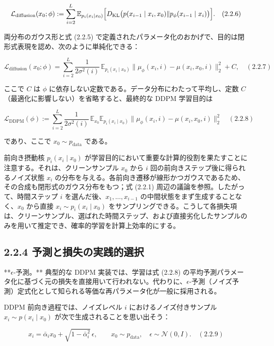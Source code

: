 \[
\mathcal{L}_{\mathrm{diffusion}}(x_0;\phi) := \sum_{i=2}^{L}\mathbb{E}_{p_i(x_i\mid x_0)}\Bigl[D_{\mathrm{KL}}\bigl(p(x_{i-1}\mid x_i,x_0)\Vert p_\phi(x_{i-1}\mid x_i)\bigr)\Bigr]. \quad (2.2.6)
\]


両分布のガウス形と式 (2.2.5) で定義されたパラメータ化のおかげで、目的は閉形式表現を認め、次のように単純化できる：

\[
\mathcal{L}_{\mathrm{diffusion}}(x_0;\phi) = \sum_{i=2}^{L}\frac{1}{2\sigma^2(i)}\,\mathbb{E}_{p_i(x_i\mid x_0)}\bigl\|\mu_\phi(x_i,i)-\mu(x_i,x_0,i)\bigr\|_2^2 + C, \quad (2.2.7)
\]


ここで $C$ は $\phi$ に依存しない定数である。データ分布にわたって平均し、定数 $C$（最適化に影響しない）を省略すると、最終的な DDPM 学習目的は

\[
\mathcal{L}_{\mathrm{DDPM}}(\phi) := \sum_{i=2}^{L}\frac{1}{2\sigma^2(i)}\,\mathbb{E}_{x_0}\mathbb{E}_{p_i(x_i\mid x_0)}\bigl\|\mu_\phi(x_i,i)-\mu(x_i,x_0,i)\bigr\|_2^2 \quad (2.2.8)
\]


であり、ここで $x_0\sim p_{\mathrm{data}}$ である。

前向き摂動核 $p_i(x_i\mid x_0)$ が学習目的において重要な計算的役割を果たすことに注意する。それは、クリーンサンプル $x_0$ から $i$ 回の前向きステップ後に得られるノイズ状態 $x_i$ の分布を与える。各前向き遷移が線形かつガウスであるため、その合成も閉形式のガウス分布をもつ；式 (2.2.1) 周辺の議論を参照。したがって、時間ステップ $i$ を選んだ後、$x_1,\ldots,x_{i-1}$ の中間状態をまず生成することなく、$x_0$ から直接 $x_i\sim p_i(x_i\mid x_0)$ をサンプリングできる。こうして各損失項は、クリーンサンプル、選ばれた時間ステップ、および直接劣化したサンプルのみを用いて推定でき、確率的学習を計算上効率的にする。

\subsection*{2.2.4 予測と損失の実践的選択}


**$\epsilon$-予測。** 典型的な DDPM 実装では、学習は式 (2.2.8) の平均予測パラメータ化に基づく元の損失を直接用いて行われない。代わりに、$\epsilon$-予測（ノイズ予測）定式化として知られる等価な再パラメータ化が一般に採用される。

DDPM 前向き過程では、ノイズレベル $i$ におけるノイズ付きサンプル $x_i\sim p(x_i\mid x_0)$ が次で生成されることを思い出そう：

\[
x_i = \bar{\alpha}_i x_0 + \sqrt{1-\bar{\alpha}_i^2}\,\epsilon, \qquad x_0\sim p_{\mathrm{data}},\quad \epsilon\sim\mathcal{N}(0,I). \quad (2.2.9)
\]


